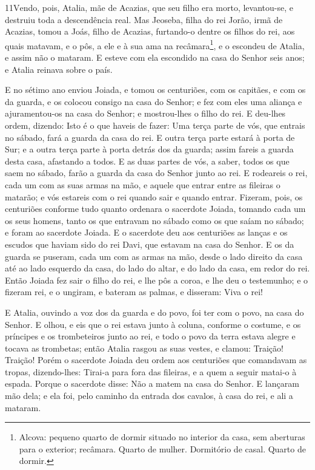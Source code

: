 \medskip

\lettrine{11} Vendo, pois, Atalia, mãe de Acazias, que seu
filho era morto, levantou-se, e destruiu toda a descendência real.
Mas Jeoseba, filha do rei Jorão, irmã de Acazias, tomou a Joás,
filho de Acazias, furtando-o dentre os filhos do rei, aos quais
matavam, e o pôs, a ele e à sua ama na recâmara\footnote{Alcova:
pequeno quarto de dormir situado no interior da casa, sem aberturas
para o exterior; recâmara. Quarto de mulher. Dormitório de casal.
Quarto de dormir.}, e o escondeu de Atalia, e assim não o mataram.
E esteve com ela escondido na casa do Senhor seis anos; e Atalia
reinava sobre o país.

E no sétimo ano enviou Joiada, e tomou os centuriões, com os
capitães, e com os da guarda, e os colocou consigo na casa do
Senhor; e fez com eles uma aliança e ajuramentou-os na casa do
Senhor; e mostrou-lhes o filho do rei. E deu-lhes ordem,
dizendo: Isto é o que haveis de fazer: Uma terça parte de vós, que
entrais no sábado, fará a guarda da casa do rei. E outra terça
parte estará à porta de Sur; e a outra terça parte à porta detrás
dos da guarda; assim fareis a guarda desta casa, afastando a todos.
E as duas partes de vós, a saber, todos os que saem no sábado,
farão a guarda da casa do Senhor junto ao rei. E rodeareis o
rei, cada um com as suas armas na mão, e aquele que entrar entre as
fileiras o matarão; e vós estareis com o rei quando sair e quando
entrar. Fizeram, pois, os centuriões conforme tudo quanto
ordenara o sacerdote Joiada, tomando cada um os seus homens, tanto
os que entravam no sábado como os que saíam no sábado; e foram ao
sacerdote Joiada. E o sacerdote deu aos centuriões as lanças
e os escudos que haviam sido do rei Davi, que estavam na casa do
Senhor. E os da guarda se puseram, cada um com as armas na
mão, desde o lado direito da casa até ao lado esquerdo da casa, do
lado do altar, e do lado da casa, em redor do rei. Então
Joiada fez sair o filho do rei, e lhe pôs a coroa, e lhe deu o
testemunho; e o fizeram rei, e o ungiram, e bateram as palmas, e
disseram: Viva o rei!

E Atalia, ouvindo a voz dos da guarda e do povo, foi ter com o
povo, na casa do Senhor. E olhou, e eis que o rei estava
junto à coluna, conforme o costume, e os príncipes e os trombeteiros
junto ao rei, e todo o povo da terra estava alegre e tocava as
trombetas; então Atalia rasgou as suas vestes, e clamou: Traição!
Traição! Porém o sacerdote Joiada deu ordem aos centuriões
que comandavam as tropas, dizendo-lhes: Tirai-a para fora das
fileiras, e a quem a seguir matai-o à espada. Porque o sacerdote
disse: Não a matem na casa do Senhor. E lançaram mão dela; e
ela foi, pelo caminho da entrada dos cavalos, à casa do rei, e ali a
mataram.

